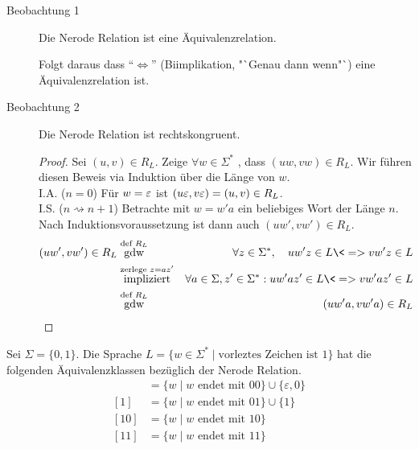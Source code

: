 \begin{description}
 \item[Beobachtung 1] Die Nerode Relation ist eine Äquivalenzrelation.
 
 Folgt daraus dass "`$\Leftrightarrow$"' (Biimplikation, "`Genau dann wenn"`) eine Äquivalenzrelation ist.
 \item[Beobachtung 2] Die Nerode Relation ist rechtskongruent.
                \begin{proof}
                Sei $(u,v)\in R_L$. Zeige $\forall w\in\Sigma^*$ , dass $(uw,vw)\in R_L$.
                Wir führen diesen Beweis via Induktion über die Länge von $w$.\\
                I.A. ($n=0$) Für $w=\varepsilon$ ist $ (u\varepsilon,v\varepsilon)=(u,v)\in R_L$.\\
                I.S. ($n\rightsquigarrow n+1$) Betrachte mit $w=w'a$ ein beliebiges Wort der Länge $n$.
                Nach Induktionsvoraussetzung ist dann auch $(uw', vw') \in R_L $.
                \begin{eqnarray*}
		(uw',vw')\in R_L 
		& \stackrel{\text{def } R_L}{\text{gdw}} & \forall z\in\Sigma^*, \quad uw'z\in L \<=> vw'z\in L\\
		& \stackrel{\text{zerlege } z=az'}{\text{impliziert}} & \forall a\in \Sigma, z'\in\Sigma^*: uw'az'\in L \<=> vw'az'\in L\\
		& \stackrel{\text{def } R_L}{\text{gdw}} & (uw'a,vw'a)\in R_L
	      \end{eqnarray*}
              \end{proof}
\end{description}

\begin{Bsp}
Sei $\Sigma=\{0,1\}$. Die Sprache $L=\{w\in\Sigma^*\mid \text{vorleztes Zeichen ist } 1\}$ hat die folgenden Äquivalenzklassen bezüglich der Nerode Relation.
        \begin{align*}
        [\Eps] &= \{w\mid w \text{ endet mit } 00 \} \cup \{\varepsilon, 0\}\\
        [1] &= \{w\mid w \text{ endet mit } 01 \} \cup \{1\}\\
        [10] &= \{w\mid w \text{ endet mit } 10 \}\\
        [11] &= \{w\mid w \text{ endet mit } 11 \}
        \end{align*}
\end{Bsp}

